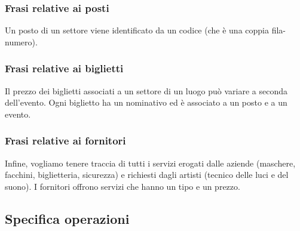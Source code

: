 \documentclass[a4paper,11pt]{article}
\begin{document}
\subsubsection*{Frasi relative ai posti}

Un posto di un settore viene identificato da un codice (che è una coppia fila-numero).

\subsubsection*{Frasi relative ai biglietti}

Il prezzo dei biglietti associati a un settore di un luogo può variare a seconda dell'evento. Ogni biglietto ha un nominativo ed è associato a un posto e a un evento.

\subsubsection*{Frasi relative ai fornitori}

Infine, vogliamo tenere traccia di tutti i servizi erogati dalle aziende (maschere, facchini, biglietteria, sicurezza) e richiesti dagli artisti (tecnico delle luci e del suono). I fornitori offrono servizi che hanno un tipo e un prezzo.

\subsection{Specifica operazioni}
\end{document}
